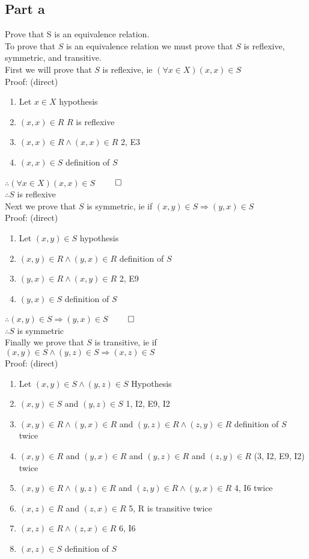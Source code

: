 \documentclass{article}
\begin{document}
		\subsection{Part a}
			Prove that S is an equivalence relation. \\
			To prove that $S$ is an equivalence relation we must prove that $S$ is reflexive, symmetric, and transitive. \\
			First we will prove that $S$ is reflexive, ie $(\forall x \in X)(x, x) \in S$ \\
			Proof: (direct)
			\begin{enumerate}
				\item Let $x \in X$ \hfill hypothesis
				\item $(x, x) \in R$ \hfill $R$ is reflexive
				\item $(x, x) \in R \land (x, x) \in R$ \hfill 2, E3
				\item $(x, x) \in S$ \hfill definition of $S$
			\end{enumerate}
			$\therefore (\forall x \in X) (x, x) \in S$ \hfill $\qed$ \\
			$\therefore S$ is reflexive \\
			Next we prove that $S$ is symmetric, ie if $(x, y) \in S \Rightarrow (y, x) \in S$ \\
			Proof: (direct)
			\begin{enumerate}
				\item Let $(x, y) \in S$ \hfill hypothesis
				\item $(x, y) \in R \land (y, x) \in R$ \hfill definition of $S$
				\item $(y, x) \in R \land (x, y) \in R$ \hfill 2, E9
				\item $(y, x) \in S$ \hfill definition of $S$
			\end{enumerate}
			$\therefore (x, y) \in S \Rightarrow (y, x) \in S$ \hfill $\qed$ \\
			$\therefore S$ is symmetric \\
			Finally we prove that $S$ is transitive, ie if $(x, y) \in S \land (y, z) \in S \Rightarrow (x, z) \in S$ \\
			Proof: (direct)
			\begin{enumerate}
				\item Let $(x, y) \in S \land (y, z) \in S$ \hfill Hypothesis
				\item $(x, y) \in S$ and $(y, z) \in S$ \hfill 1, I2, E9, I2
				\item $(x, y) \in R \land (y, x) \in R$ and $(y, z) \in R \land (z, y) \in R$ \hfill definition of $S$ twice
				\item $(x, y) \in R$ and $(y, x) \in R$ and $(y, z) \in R$ and $(z, y) \in R$ \hfill (3, I2, E9, I2) twice
				\item $(x, y) \in R \land (y, z) \in R$ and $(z, y) \in R \land (y, x) \in R$ \hfill 4, I6 twice
				\item $(x, z) \in R$ and $(z, x) \in R$ \hfill 5, R is transitive twice
				\item $(x, z) \in R \land (z, x) \in R$ \hfill 6, I6
				\item $(x, z) \in S$ \hfill definition of $S$
			\end{enumerate}
\end{document}

